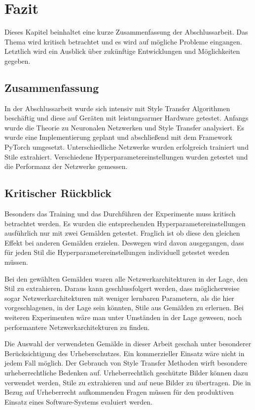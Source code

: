 \chapter{Fazit}

Dieses Kapitel beinhaltet eine kurze Zusammenfassung der Abschlussarbeit. Das Thema wird kritisch betrachtet und es wird auf mögliche Probleme eingangen. Letztlich wird ein Ausblick über zukünftige Entwicklungen und Möglichkeiten gegeben.

\section{Zusammenfassung}

In der Abschlussarbeit wurde sich intensiv mit Style Transfer Algorithmen beschäftig und diese auf Geräten mit leistungsarmer Hardware getestet. Anfangs wurde die Theorie zu Neuronalen Netzwerken und Style Transfer analysiert. Es wurde eine Implementierung geplant und abschließend mit dem Framework PyTorch umgesetzt. Unterschiedliche Netzwerke wurden erfolgreich trainiert und Stile extrahiert. Verschiedene Hyperparametereinstellungen wurden getestet und die Performanz der Netzwerke gemessen.


\section{Kritischer Rückblick}

Besonders das Training und das Durchführen der Experimente muss kritisch betrachtet werden. Es wurden die entsprechenden Hyperparametereinstellungen ausführlich nur mit zwei Gemälden getestet. Fraglich ist ob diese den gleichen Effekt bei anderen Gemälden erzielen. Deswegen wird davon ausgegangen, dass für jeden Stil die Hyperparametereinstellungen individuell getestet werden müssen.

Bei den gewählten Gemälden waren alle Netzwerkarchitekturen in der Lage, den Stil zu extrahieren. Daraus kann geschlussfolgert werden, dass möglicherweise sogar Netzwerkarchitekturen mit weniger lernbaren Parametern, als die hier vorgeschlagenen, in der Lage sein könnten, Stile aus Gemälden zu erlernen. Bei weiteren Experimenten wäre man unter Umständen in der Lage gewesen, noch performantere Netzwerkarchitekturen zu finden.

Die Auswahl der verwendeten Gemälde in dieser Arbeit geschah unter besonderer Berücksichtigung des Urheberschutzes. Ein kommerzieller Einsatz wäre nicht in jedem Fall möglich. Der Gebrauch von Style Transfer Methoden wirft besondere urheberrechtliche Bedenken auf. Urheberrechtlich geschützte Bilder können dazu verwendet werden, Stile zu extrahieren und auf neue Bilder zu übertragen. Die in Bezug auf Urheberrecht aufkommenden Fragen müssen für den produktiven Einsatz eines Software-Systems evaluiert werden.

